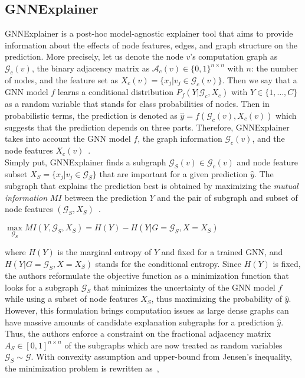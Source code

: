 \subsection{GNNExplainer}
\label{subsec:ExplainingGNNs_GNNExplainer}
GNNExplainer is a post-hoc model-agnostic explainer tool that aims to provide information about the effects of node features, edges, and graph structure on the prediction. More precisely, let us denote the node $v$'s computation graph as $\mathcal{G}_c(v)$, the binary adjacency matrix as $\mathcal{A}_c(v) \in \{0, 1\}^{n \times n}$ with $n$: the number of nodes, and the feature set as $X_c(v) = \{x_j|v_j \in \mathcal{G}_c(v)\}$. Then we say that a GNN model $f$ learns a conditional distribution $P_f(Y | \mathcal{G}_c, X_c)$ with $Y \in \{1, \dots, C\}$ as a random variable that stands for class probabilities of nodes. Then in probabilistic terms, the prediction is denoted as $\hat{y} = f(\mathcal{G}_c(v), X_c(v))$ which suggests that the prediction depends on three parts. Therefore, GNNExplainer takes into account the GNN model $f$, the graph information $\mathcal{G}_c(v)$, and the node features $X_c(v)$~\parencite{GNNExplainer_Ying}.\\
Simply put, GNNExplainer finds a subgraph $\mathcal{G}_S(v) \in \mathcal{G}_c(v)$ and node feature subset $X_S = \{x_j | v_j \in \mathcal{G}_S\}$ that are important for a given prediction $\hat{y}$. The subgraph that explains the prediction best is obtained by maximizing the \emph{mutual information} $MI$ between the prediction $Y$ and the pair of subgraph and subset of node features $(\mathcal{G}_S, X_S)$~\parencite{GNNExplainer_Ying}.
\begin{center}
    $\max\limits_{\mathcal{G}_S} MI(Y, \mathcal{G}_S, X_S) = H(Y) - H(Y|G=\mathcal{G}_S, X=X_S)$
\end{center}
where $H(Y)$ is the marginal entropy of $Y$ and fixed for a trained GNN, and $H(Y|G=\mathcal{G}_S, X=X_S)$ stands for the conditional entropy. Since $H(Y)$ is fixed, the authors reformulate the objective function as a minimization function that looks for a subgraph $\mathcal{G}_S$ that minimizes the uncertainty of the GNN model $f$ while using a subset of node features $X_S$, thus maximizing the probability of $\hat{y}$. However, this formulation brings computation issues as large dense graphs can have massive amounts of candidate explanation subgraphs for a prediction $\hat{y}$. Thus, the authors enforce a constraint on the fractional adjacency matrix $A_S \in [0, 1]^{n \times n}$ of the subgraphs which are now treated as random variables $\mathcal{G}_S \sim \mathcal{G}$. With convexity assumption and upper-bound from Jensen's inequality, the minimization problem is rewritten as~\parencite{GNNExplainer_Ying},
